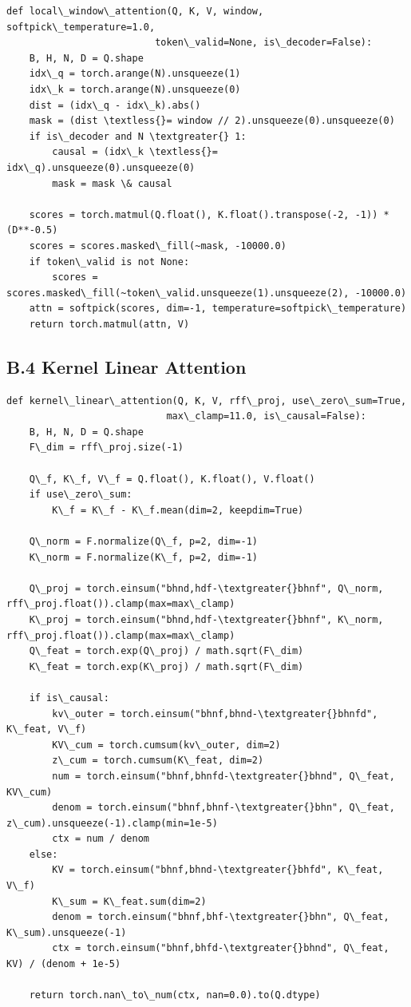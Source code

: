 \begin{lstlisting}
def local\_window\_attention(Q, K, V, window, softpick\_temperature=1.0, 
                          token\_valid=None, is\_decoder=False):
    B, H, N, D = Q.shape
    idx\_q = torch.arange(N).unsqueeze(1)
    idx\_k = torch.arange(N).unsqueeze(0)
    dist = (idx\_q - idx\_k).abs()
    mask = (dist \textless{}= window // 2).unsqueeze(0).unsqueeze(0)
    if is\_decoder and N \textgreater{} 1:
        causal = (idx\_k \textless{}= idx\_q).unsqueeze(0).unsqueeze(0)
        mask = mask \& causal
    
    scores = torch.matmul(Q.float(), K.float().transpose(-2, -1)) * (D**-0.5)
    scores = scores.masked\_fill(~mask, -10000.0)
    if token\_valid is not None:
        scores = scores.masked\_fill(~token\_valid.unsqueeze(1).unsqueeze(2), -10000.0)
    attn = softpick(scores, dim=-1, temperature=softpick\_temperature)
    return torch.matmul(attn, V)
\end{lstlisting}

\subsection{B.4 Kernel Linear Attention}

\begin{lstlisting}
def kernel\_linear\_attention(Q, K, V, rff\_proj, use\_zero\_sum=True, 
                            max\_clamp=11.0, is\_causal=False):
    B, H, N, D = Q.shape
    F\_dim = rff\_proj.size(-1)
    
    Q\_f, K\_f, V\_f = Q.float(), K.float(), V.float()
    if use\_zero\_sum:
        K\_f = K\_f - K\_f.mean(dim=2, keepdim=True)
    
    Q\_norm = F.normalize(Q\_f, p=2, dim=-1)
    K\_norm = F.normalize(K\_f, p=2, dim=-1)
    
    Q\_proj = torch.einsum("bhnd,hdf-\textgreater{}bhnf", Q\_norm, rff\_proj.float()).clamp(max=max\_clamp)
    K\_proj = torch.einsum("bhnd,hdf-\textgreater{}bhnf", K\_norm, rff\_proj.float()).clamp(max=max\_clamp)
    Q\_feat = torch.exp(Q\_proj) / math.sqrt(F\_dim)
    K\_feat = torch.exp(K\_proj) / math.sqrt(F\_dim)
    
    if is\_causal:
        kv\_outer = torch.einsum("bhnf,bhnd-\textgreater{}bhnfd", K\_feat, V\_f)
        KV\_cum = torch.cumsum(kv\_outer, dim=2)
        z\_cum = torch.cumsum(K\_feat, dim=2)
        num = torch.einsum("bhnf,bhnfd-\textgreater{}bhnd", Q\_feat, KV\_cum)
        denom = torch.einsum("bhnf,bhnf-\textgreater{}bhn", Q\_feat, z\_cum).unsqueeze(-1).clamp(min=1e-5)
        ctx = num / denom
    else:
        KV = torch.einsum("bhnf,bhnd-\textgreater{}bhfd", K\_feat, V\_f)
        K\_sum = K\_feat.sum(dim=2)
        denom = torch.einsum("bhnf,bhf-\textgreater{}bhn", Q\_feat, K\_sum).unsqueeze(-1)
        ctx = torch.einsum("bhnf,bhfd-\textgreater{}bhnd", Q\_feat, KV) / (denom + 1e-5)
    
    return torch.nan\_to\_num(ctx, nan=0.0).to(Q.dtype)
\end{lstlisting}

